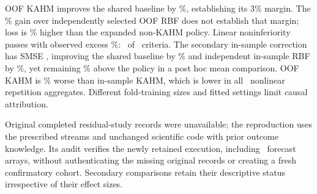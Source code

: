 OOF KAHM improves the shared baseline by \CFRGainBias\%, establishing
its 3\% margin. The \CFRGainRBF\% gain over independently selected
OOF RBF does not establish that margin; loss is \CFRPolicyPenalty\%
higher than the expanded non-KAHM policy. Linear noninferiority passes
with observed excess \CFRLinearPenalty\%: \CFRPrimaryEstablished\ of
\CFRPrimaryCount\ criteria. The secondary in-sample correction has
SMSE \CFRISLoss{}, improving the shared baseline by \CFRISGainBias\%
and independent in-sample RBF by \CFRISGainRBF\%, yet remaining
\CFRISPolicyPenalty\% above the policy in a post hoc mean comparison.
OOF KAHM is \CFROOFvsISPenalty\% worse than in-sample KAHM, which is
lower in all \CFRRepetitions\ nonlinear repetition aggregates.
Different fold-training sizes and fitted settings limit causal attribution.

Original completed residual-study records were unavailable; the
reproduction uses the prescribed streams and unchanged scientific code
with prior outcome knowledge. Its audit verifies the newly retained
execution, including \CFRAuditArrays\ forecast arrays, without
authenticating the missing original records or creating a fresh
confirmatory cohort. Secondary comparisons retain their descriptive
status irrespective of their effect sizes.
